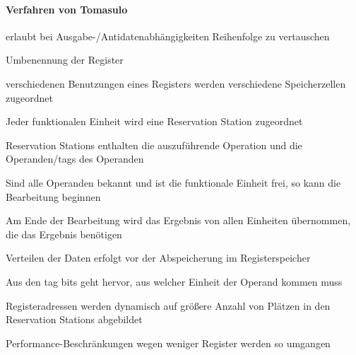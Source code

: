 \documentclass[10pt,landscape]{article}
\begin{document}
\begin{multicols}{3}
  \paragraph{Verfahren von Tomasulo}
  \begin{itemize*}
    \item erlaubt bei Ausgabe-/Antidatenabhängigkeiten Reihenfolge zu vertauschen
    \item Umbenennung der Register
    \item verschiedenen Benutzungen eines Registers werden verschiedene Speicherzellen zugeordnet
    \item Jeder funktionalen Einheit wird eine Reservation Station zugeordnet
    \item Reservation Stations enthalten die auszuführende Operation und die Operanden/tags des Operanden
    \item Sind alle Operanden bekannt und ist die funktionale Einheit frei, so kann die Bearbeitung beginnen
    \item Am Ende der Bearbeitung wird das Ergebnis von allen Einheiten übernommen, die das Ergebnis benötigen
    \item Verteilen der Daten erfolgt vor der Abspeicherung im Registerspeicher
    \item Aus den tag bits geht hervor, aus welcher Einheit der Operand kommen muss
    \item Registeradressen werden dynamisch auf größere Anzahl von Plätzen in den Reservation Stations abgebildet
    \item Performance-Beschränkungen wegen weniger Register werden so umgangen
  \end{itemize*}
  

\end{multicols}
\end{document}
